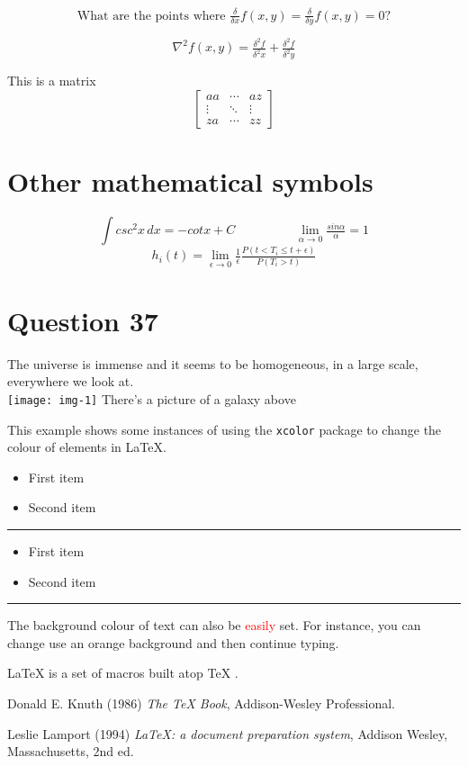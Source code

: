 \documentclass{article}
\begin{document}
$$
\textrm {What are the points where }  \tfrac{\delta}{\delta x} f(x, y) = \tfrac{\delta}{\delta y} f(x, y) = 0 ? 
$$

$$
\nabla^{2}f(x, y) = \tfrac{\delta^{2}f}{\delta^{2}x} + \tfrac{\delta^{2}f}{\delta^{2}y}
$$

This is a matrix
\[
\begin{bmatrix}
aa & \cdots & az\\
\vdots & \ddots & \vdots\\
za & \cdots & zz
\end{bmatrix}
\]

\section{Other mathematical symbols}

\[ 
\int csc^{2}x \,dx = -cot x + C \hspace{2cm}
\lim_{\alpha\to 0} \tfrac{sin \alpha}{\alpha} = 1
\]
\[
h_i(t) = \lim_{\epsilon\to 0} \tfrac{1}{\epsilon}\tfrac{P(t<T_i\le t+\epsilon)}{P(T_i>t)}
\]

\section{Question 37}
The universe is immense and it seems to be homogeneous, 
in a large scale, everywhere we look at. \\
\texttt{[image: img-1]}
There's a picture of a galaxy above

This example shows some instances of using the \texttt{xcolor} package 
to change the colour of elements in \LaTeX.

\begin{itemize}
\color{blue}
\item First item
\item Second item
\end{itemize}

\noindent
{\color{red} \rule{\linewidth}{0.5mm}}
\begin{itemize}
\color{ForestGreen}
\item First item
\item Second item
\end{itemize}

\noindent
{\color{RubineRed} \rule{\linewidth}{0.5mm}}

The background colour of text can also be \textcolor{red}{easily} set. For 
instance, you can change use an \colorbox{BurntOrange}{orange background} and then continue typing.

\LaTeX{} \cite{lamport94} is a set of macros built atop \TeX{} \cite{texbook}.

\begin{thebibliography}{9}
Donald E. Knuth (1986) \emph{The \TeX{} Book}, Addison-Wesley Professional.

Leslie Lamport (1994) \emph{\LaTeX: a document preparation system}, Addison
Wesley, Massachusetts, 2nd ed.
\end{thebibliography}
\end{document}
